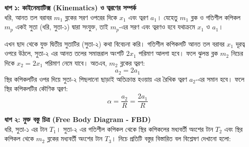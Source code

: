 \documentclass[12pt, a4paper]{article}
\begin{document}
\begin{tcolorbox}[solutionbox={সমাধান (Solution)}]
\noindent
\textbf{ধাপ ১: কাইনেম্যাটিক্স (Kinematics) ও ত্বরণের সম্পর্ক} \\
ধরি, আনত তল বরাবর $m_1$ ব্লকের সরণ ওপরের দিকে $x_1$ এবং ত্বরণ $a_1$। 
যেহেতু $m_1$ ব্লক ও গতিশীল কপিকল $m_p$ একই সুতা (ধরি, সুতা-১) দ্বারা সংযুক্ত, তাই $m_p$-এর সরণ এবং ত্বরণও হবে যথাক্রমে $x_1$ ও $a_1$। 

এখন ছাদ থেকে যুক্ত দ্বিতীয় সুতাটির (সুতা-২) কথা বিবেচনা করি। গতিশীল কপিকলটি আনত তল বরাবর $x_1$ দূরত্ব ওপরে উঠলে, সুতা-২ এর আনত তলের সমান্তরাল অংশটি $2x_1$ পরিমাণ আলগা হবে। ফলে ঝুলন্ত ব্লক $m_2$ নিচের দিকে $x_2 = 2x_1$ পরিমাণ নেমে যাবে।
অতএব, $m_2$ ব্লকের ত্বরণ: 
\[ a_2 = 2a_1 \]
স্থির কপিকলটির ওপর দিয়ে সুতা-২ পিছলানো ছাড়াই অতিক্রান্ত হওয়ায় এর রৈখিক ত্বরণ $a_2$-এর সমান হবে। ফলে স্থির কপিকলটির কৌণিক ত্বরণ:
\[ \alpha = \frac{a_2}{R} = \frac{2a_1}{R} \]

\vspace{0.5em}
\noindent
\textbf{ধাপ ২: মুক্ত বস্তু চিত্র (Free Body Diagram - FBD)} \\
ধরি, সুতা-১ এর টান $T_1$। সুতা-২ এর গতিশীল কপিকল থেকে স্থির কপিকলের মধ্যবর্তী অংশের টান $T_2$ এবং স্থির কপিকল থেকে $m_2$ ব্লকের মধ্যবর্তী অংশের টান $T_3$। নিচে প্রতিটি বস্তুর বিস্তারিত বল বিশ্লেষণ দেখানো হলো:

\vspace{1em}
\begin{center}
\end{center}
\end{tcolorbox}
\end{document}
